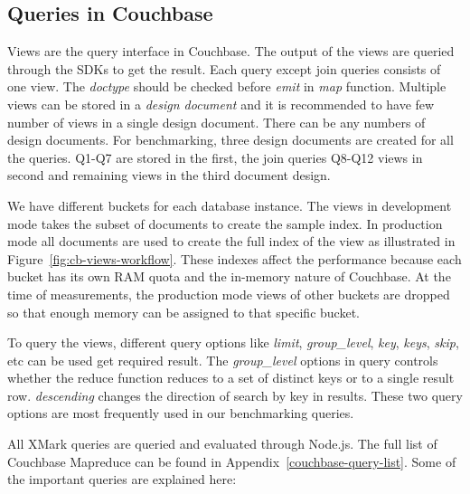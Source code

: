 \subsection{Queries in Couchbase}
Views are the query interface in Couchbase. The output of the views are queried through the SDKs to get the result. Each query except join queries consists of one view. The \textit{doctype} should be checked before \textit{emit} in \textit{map} function. Multiple views can be stored in a \textit{design document} and it is recommended to have few number of views in a single design document. There can be any numbers of design documents. For benchmarking, three design documents are created for all the queries. Q1-Q7 are stored in the first, the join queries Q8-Q12 views in second and remaining views in the third document design. 
\par
We have different buckets for each database instance. The views in development mode takes the subset of documents to create the sample index. In production mode all documents are used to create the full index of the view  as illustrated in Figure~\ref{fig:cb-views-workflow}. These indexes affect the performance because each bucket has its own RAM quota and the in-memory nature of Couchbase. At the time of measurements, the production mode views of other buckets are dropped so that enough memory can be assigned to that specific bucket. 
\par 
To query the views, different query options like \textit{limit}, \textit{group\_level}, \textit{key}, \textit{keys}, \textit{skip}, etc can be used get required result. The \textit{group\_level} options in query controls whether the reduce function reduces to a set of distinct keys or to a single result row.  \textit{descending} changes the direction of search by key in results. These two query options are most frequently used in our benchmarking queries.
\par
All XMark queries  are queried and evaluated through Node.js. The full list of Couchbase Mapreduce can be found in Appendix~\ref{couchbase-query-list}. Some of the important queries are explained here:


